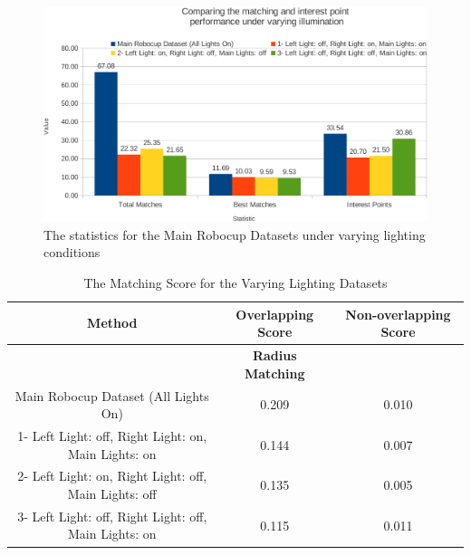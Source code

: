 \documentclass[11pt]{report}
\begin{document}
\begin{figure}[h!] 
  \centering
    \includegraphics[width=1.0\textwidth]{../Drawings/Graphs/varyingLight_matches_keypoints_best.pdf}
    \caption{The statistics for the Main Robocup Datasets under varying lighting conditions}
    \label{fig:varyingLighting_matches_keypoints}
\end{figure}

\begin{table}
\caption{The Matching Score for the Varying Lighting Datasets}
\begin{tabular}{|c|c|c|}
\hline 
\multicolumn{1}{|c||}{\textbf{Method}} & \multicolumn{1}{c||}{\textbf{Overlapping Score}} & \multicolumn{1}{c|}{\textbf{Non-overlapping Score}}\tabularnewline
\hline 
\hline 
 & \textbf{Radius Matching} & \tabularnewline
\hline 
Main Robocup Dataset (All Lights On) & 0.209 & 0.010\tabularnewline
\hline 
1- Left Light: off, Right Light: on, Main Lights: on & 0.144 & 0.007\tabularnewline
\hline 
2- Left Light: on, Right Light: off, Main Lights: off & 0.135 & 0.005\tabularnewline
\hline 
3- Left Light: off, Right Light: off, Main Lights: on & 0.115 & 0.011\tabularnewline
\hline 
\end{tabular}
\label{tab:lvMS}
\end{table}

\end{document}
